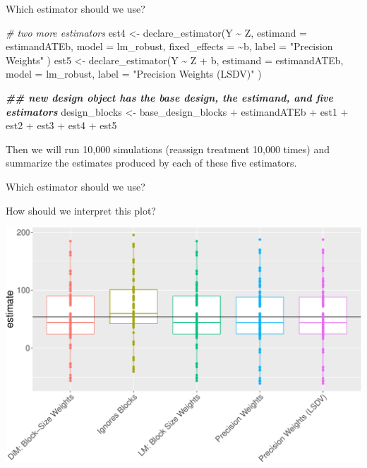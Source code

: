 \documentclass[
  ignorenonframetext,
]{beamer}
\newenvironment{Shaded}{\begin{snugshade}}{\end{snugshade}}
\newcommand{\AttributeTok}[1]{\textcolor[rgb]{0.77,0.63,0.00}{#1}}
\newcommand{\CommentTok}[1]{\textcolor[rgb]{0.56,0.35,0.01}{\textit{#1}}}
\newcommand{\DocumentationTok}[1]{\textcolor[rgb]{0.56,0.35,0.01}{\textbf{\textit{#1}}}}
\newcommand{\FunctionTok}[1]{\textcolor[rgb]{0.00,0.00,0.00}{#1}}
\newcommand{\NormalTok}[1]{#1}
\newcommand{\OtherTok}[1]{\textcolor[rgb]{0.56,0.35,0.01}{#1}}
\newcommand{\SpecialCharTok}[1]{\textcolor[rgb]{0.00,0.00,0.00}{#1}}
\newcommand{\StringTok}[1]{\textcolor[rgb]{0.31,0.60,0.02}{#1}}
\begin{document}
\begin{frame}[fragile]{Which estimator should we use?}
\protect\hypertarget{which-estimator-should-we-use-2}{}
\scriptsize

\begin{Shaded}
\begin{Highlighting}[]
\CommentTok{\# two more estimators}
\NormalTok{est4 }\OtherTok{\textless{}{-}} \FunctionTok{declare\_estimator}\NormalTok{(Y }\SpecialCharTok{\textasciitilde{}}\NormalTok{ Z,}
  \AttributeTok{estimand =}\NormalTok{ estimandATEb,}
  \AttributeTok{model =}\NormalTok{ lm\_robust, }\AttributeTok{fixed\_effects =} \SpecialCharTok{\textasciitilde{}}\NormalTok{b, }\AttributeTok{label =} \StringTok{"Precision Weights"}
\NormalTok{)}
\NormalTok{est5 }\OtherTok{\textless{}{-}} \FunctionTok{declare\_estimator}\NormalTok{(Y }\SpecialCharTok{\textasciitilde{}}\NormalTok{ Z }\SpecialCharTok{+}\NormalTok{ b,}
  \AttributeTok{estimand =}\NormalTok{ estimandATEb,}
  \AttributeTok{model =}\NormalTok{ lm\_robust, }\AttributeTok{label =} \StringTok{"Precision Weights (LSDV)"}
\NormalTok{)}

\DocumentationTok{\#\# new design object has the base design, the estimand, and five estimators}
\NormalTok{design\_blocks }\OtherTok{\textless{}{-}}\NormalTok{ base\_design\_blocks }\SpecialCharTok{+}\NormalTok{ estimandATEb }\SpecialCharTok{+}
\NormalTok{  est1 }\SpecialCharTok{+}\NormalTok{ est2 }\SpecialCharTok{+}\NormalTok{ est3 }\SpecialCharTok{+}\NormalTok{ est4 }\SpecialCharTok{+}\NormalTok{ est5}
\end{Highlighting}
\end{Shaded}

\normalsize

Then we will run 10,000 simulations (reassign treatment 10,000 times)
and summarize the estimates produced by each of these five estimators.
\end{frame}

\begin{frame}{Which estimator should we use?}
\protect\hypertarget{which-estimator-should-we-use-3}{}
\scriptsize\normalsize

\scriptsize\normalsize

How should we interpret this plot?

\scriptsize

\includegraphics[width=.9\textwidth,]{figs/figsim_plot2-1} \normalsize
\end{frame}
\end{document}
